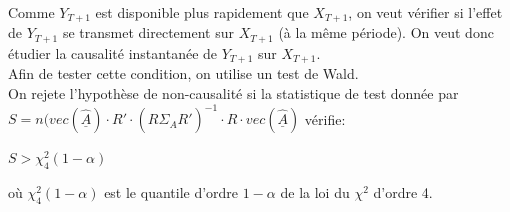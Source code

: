 \documentclass[a4paper, 12pt]{article} %
\begin{document}
\normalsize{
{Comme $Y_{T+1}$ est disponible plus rapidement que $X_{T+1}$, on veut vérifier si l'effet de $Y_{T+1}$ se transmet directement sur $X_{T+1}$ (à la même période). On veut donc étudier la causalité instantanée de $Y_{T+1}$ sur $X_{T+1}$.\\
Afin de tester cette condition, on utilise un test de Wald.\\
On rejete l'hypothèse de non-causalité si la statistique de test donnée par $S = n(vec(\underline{\hat{A}}) \cdot R' \cdot (R \hat{\Sigma_A}R')^{-1} \cdot R \cdot vec(\underline{\hat{A}})$ vérifie:

\begin{center}
$S > \chi^2_{4}(1- \alpha)$
\end{center}
où $\chi^2_{4}(1- \alpha)$ est le quantile d'ordre $1- \alpha$ de la loi du $\chi^2$ d'ordre 4.
}}
\end{document}
